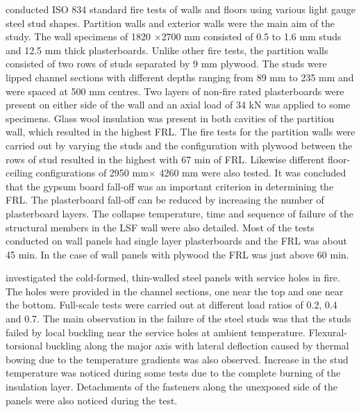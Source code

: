 \citet{Sakumoto2003} conducted ISO 834 standard fire tests of walls and floors using various light gauge steel stud shapes. Partition walls and exterior walls were the main aim of the study. The wall specimens of 1820 $\times$2700 mm consisted of 0.5 to 1.6 mm studs and 12.5 mm thick plasterboards. Unlike other fire tests, the partition walls consisted of two rows of studs separated by 9 mm plywood. The studs were lipped channel sections with different depths ranging from 89 mm to 235 mm and were spaced at 500 mm centres. Two layers of non-fire rated plasterboards were present on either side of the wall and an axial load of 34 kN was applied to some specimens. Glass wool insulation was present in both cavities of the partition wall, which resulted in the highest FRL. The fire tests for the partition walls were carried out by varying the studs and the configuration with plywood between the rows of stud resulted in the highest with 67 min of FRL. Likewise different floor-ceiling configurations of 2950 mm$\times$ 4260 mm were also tested. It was concluded that the gypsum board fall-off was an important criterion in determining the FRL. The plasterboard fall-off can be reduced by increasing the number of plasterboard layers. The collapse temperature, time and sequence of failure of the structural members in the LSF wall were also detailed. Most of the tests conducted on wall panels had single layer plasterboards and the FRL was about 45 min. In the case of wall panels with plywood the FRL was just above 60 min. 

\citet{Feng2005} investigated the cold-formed, thin-walled steel panels with service holes in fire. The holes were provided in the channel sections, one near the top and one near the bottom. Full-scale tests were carried out at different load ratios of 0.2, 0.4 and 0.7. The main observation in the failure of the steel studs was that the studs failed by local buckling near the service holes at ambient temperature. Flexural-torsional buckling along the major axis with lateral deflection caused by thermal bowing due to the temperature gradients was also observed. Increase in the stud temperature was noticed during some tests due to the complete burning of the insulation layer. Detachments of the fasteners along the unexposed side of the panels were also noticed during the test. 

